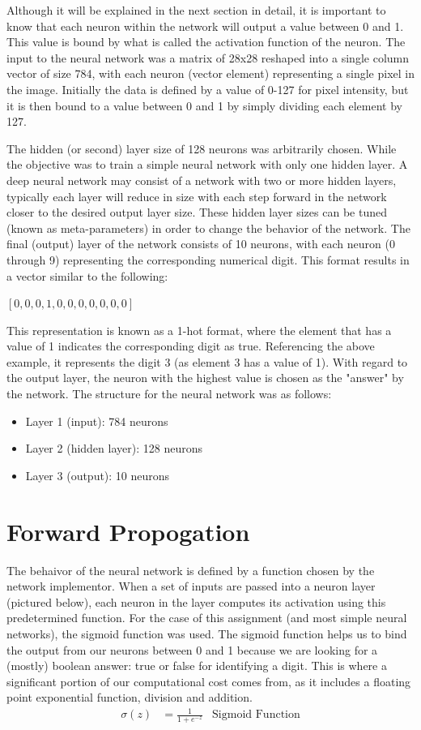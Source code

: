\documentclass[11pt]{article}
\begin{document}
Although it will be explained in the next section in detail, it is important to know that each neuron within the network will output a value between 0 and 1. This value is bound by what is called the activation function of the neuron. The input to the neural network was a matrix of 28x28 reshaped into a single column vector of size 784, with each neuron (vector element) representing a single pixel in the image. Initially the data is defined by a value of 0-127 for pixel intensity, but it is then bound to a value between 0 and 1 by simply dividing each element by 127. 

The hidden (or second) layer size of 128 neurons was arbitrarily chosen. While the objective was to train a simple neural network with only one hidden layer. A deep neural network may consist of a network with two or more hidden layers, typically each layer will reduce in size with each step forward in the network closer to the desired output layer size. These hidden layer sizes can be tuned (known as meta-parameters) in order to change the behavior of the network. The final (output) layer of the network consists of 10 neurons, with each neuron (0 through 9) representing the corresponding numerical digit. This format results in a vector similar to the following:
\begin{center}
	$[ 0, 0, 0, 1, 0, 0, 0, 0, 0, 0, 0 ]$\\
\end{center}
This representation is known as a 1-hot format, where the element that has a value of 1 indicates the corresponding digit as true. Referencing the above example, it represents the digit 3 (as element 3 has a value of 1). With regard to the output layer, the neuron with the highest value is chosen as the "answer" by the network. The structure for the neural network was as follows:
\begin{itemize}[noitemsep,nolistsep]
	\item Layer 1 (input): 784 neurons
	\item Layer 2 (hidden layer): 128 neurons
	\item Layer 3 (output): 10 neurons
\end{itemize}


\section{Forward Propogation}
The behaivor of the neural network is defined by a function chosen by the network implementor. When a set of inputs are passed into a neuron layer (pictured below), each neuron in the layer computes its activation using this predetermined function. For the case of this assignment (and most simple neural networks), the sigmoid function was used. The sigmoid function helps us to bind the output from our neurons between 0 and 1 because we are looking for a (mostly) boolean answer: true or false for identifying a digit. This is where a significant portion of our computational cost comes from, as it includes a floating point exponential function, division and addition.
\begin{align}
	\sigma(z) & = \frac{1}{1 + e^{-z}} & \text{Sigmoid Function} 
\end{align}
\end{document}
